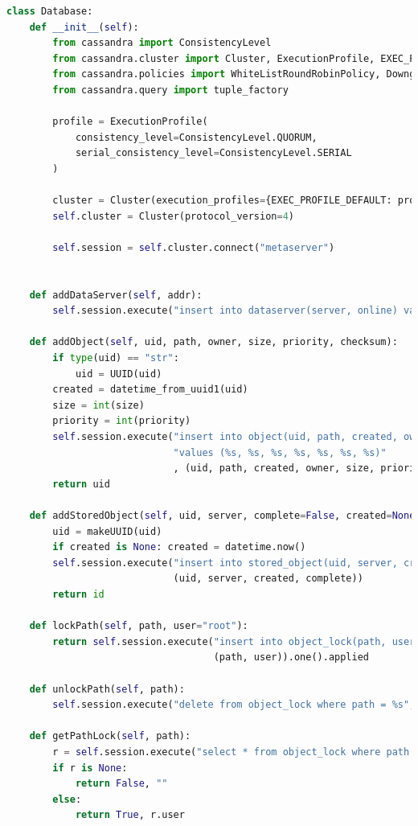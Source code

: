 \documentclass{article}
\begin{document}
\begin{lstlisting}[language=Python, title=Codice]
class Database:
    def __init__(self):
        from cassandra import ConsistencyLevel
        from cassandra.cluster import Cluster, ExecutionProfile, EXEC_PROFILE_DEFAULT
        from cassandra.policies import WhiteListRoundRobinPolicy, DowngradingConsistencyRetryPolicy
        from cassandra.query import tuple_factory

        profile = ExecutionProfile(
            consistency_level=ConsistencyLevel.QUORUM,
            serial_consistency_level=ConsistencyLevel.SERIAL
        )

        cluster = Cluster(execution_profiles={EXEC_PROFILE_DEFAULT: profile})
        self.cluster = Cluster(protocol_version=4)

        self.session = self.cluster.connect("metaserver")


    def addDataServer(self, addr):
        self.session.execute("insert into dataserver(server, online) values (%s, false)", (addr, ))

    def addObject(self, uid, path, owner, size, priority, checksum):
        if type(uid) == "str":
            uid = UUID(uid)
        created = datetime_from_uuid1(uid)
        size = int(size)
        priority = int(priority)
        self.session.execute("insert into object(uid, path, created, owner, size, priority, checksum) "
                             "values (%s, %s, %s, %s, %s, %s, %s)"
                             , (uid, path, created, owner, size, priority, checksum))
        return uid

    def addStoredObject(self, uid, server, complete=False, created=None):
        uid = makeUUID(uid)
        if created is None: created = datetime.now()
        self.session.execute("insert into stored_object(uid, server, created, complete) values (%s, %s, %s, %s)",
                             (uid, server, created, complete))
        return id

    def lockPath(self, path, user="root"):
        return self.session.execute("insert into object_lock(path, user) values (%s, %s) if not exists",
                                    (path, user)).one().applied

    def unlockPath(self, path):
        self.session.execute("delete from object_lock where path = %s", (path, ))

    def getPathLock(self, path):
        r = self.session.execute("select * from object_lock where path = %s", (path, )).one()
        if r is None:
            return False, ""
        else:
            return True, r.user


\end{lstlisting}
\end{document}
